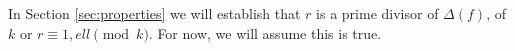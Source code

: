 In Section \ref{sec:properties} we will establish that $r$ is a prime divisor of $\Delta(f)$, of ${k}$ or $r\equiv 1,{ell}\pmod{{k}}$. For now, we will assume this is true.